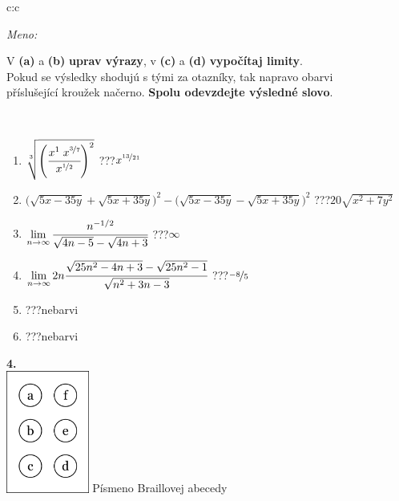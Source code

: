 \documentclass[10pt]{report}
\begin{document}
\begin{tabular}{c:c}
\begin{minipage}[c][104.5mm][t]{0.5\linewidth}
\begin{center}
\textit{Meno:}\phantom{xxxxxxxxxxxxxxxxxxxxxxxxxxxxxxxxxxxxxxxxxxxxxxxxxxxxxxxxxxxxxxxxx}\\[5mm]
\begin{minipage}{0.95\linewidth}
\begin{center}
V \textbf{(a)} a \textbf{(b)} \textbf{uprav výrazy}, v \textbf{(c)} a \textbf{(d)} \textbf{vypočítaj limity}.\\Pokud se výsledky shodujú s tými za otazníky, tak napravo obarvi\\příslušející kroužek načerno. \textbf{Spolu odevzdejte výsledné slovo}.
\end{center}
\end{minipage}
\\[1mm]
\begin{minipage}{0.79\linewidth}
\begin{center}
\begin{varwidth}{\linewidth}
\begin{enumerate}
\small
\item $\sqrt[3]{\left(\cfrac{x^{1}\;x^{\nicefrac{3}{7}}}{x^{\nicefrac{1}{2}}}\right)^{2}}$\quad \dotfill\; ???\;\dotfill \quad $x^{\nicefrac{13}{21}}$
\item {\footnotesize{\scriptsize$\big(\sqrt{5x-35y}+\sqrt{5x+35y}\big)^2-\big(\sqrt{5x-35y}-\sqrt{5x+35y}\big)^2$}\quad \dotfill\; ???\;\dotfill \quad $20\sqrt{x^2+7y^2}$}
\item $\lim\limits_{n\to\infty}\cfrac{n^{-1/2}}{\sqrt{4n-5}-\sqrt{4n+3}}$\quad \dotfill\; ???\;\dotfill \quad $\infty$
\item $\lim\limits_{n\to\infty}2n\cfrac{\sqrt{25n^2-4n+3}-\sqrt{25n^2-1}}{\sqrt{n^2+3n-3}}$\quad \dotfill\; ???\;\dotfill \quad $\nicefrac{-8}{5}$
\item \quad \dotfill\; ???\;\dotfill \quad nebarvi
\item \quad \dotfill\; ???\;\dotfill \quad nebarvi
\end{enumerate}
\end{varwidth}
\end{center}
\end{minipage}
\begin{minipage}{0.20\linewidth}
\begin{center}
{\Huge\bfseries 4.} \\[2mm]
\includegraphics[height=40mm]{../images/braille.png}
{\small Písmeno Braillovej abecedy}
\end{center}
\end{minipage}
\end{center}
\end{minipage}
%
\end{tabular}
\end{document}

